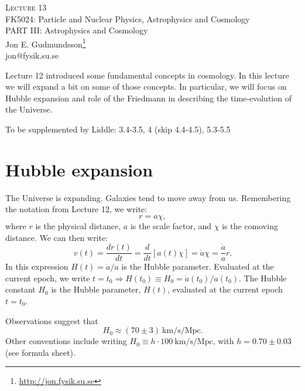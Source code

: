\documentclass[a4paper,12pt]{article}
\theoremstyle{remark}
\newcommand{\mrm}[1]{\mathrm{#1}}
\renewcommand{\=}[1]{\stackrel{#1}{=}} %
\newcommand{\linkc}[1]{\textcolor{linkc}{#1}}
\theoremstyle{plain}
\theoremstyle{definition}
\begin{document}
\fontsize{5mm}{6mm}\selectfont\thispagestyle{empty}

\thispagestyle{empty}
\begin{center}
\textsc{Lecture 13}\\[1.5ex]
{\Huge FK5024: Particle and Nuclear Physics, Astrophysics and Cosmology\\}
\vspace{3mm}
{\large PART III: Astrophysics and Cosmology \\}
Jon E. Gudmundsson\footnote{\href{http://jon.fysik.su.se}{\linkc{http://jon.fysik.su.se}}} \\
\linkc{jon@fysik.su.se}
\end{center}

Lecture 12 introduced some fundamental concepts in cosmology. In this lecture we will expand a bit on some of those concepts. In particular, we will focus on Hubble expansion and role of the Friedmann in describing the time-evolution of the Universe.
\begin{attention}
To be supplemented by Liddle: 3.4-3.5, 4 (skip 4.4-4.5), 5.3-5.5
\end{attention}

\section{Hubble expansion}
The Universe is expanding. Galaxies tend to move away from us. Remembering the notation from Lecture 12, we write:
\begin{equation}
r = a \chi,
\end{equation}
where $r$ is the physical distance, $a$ is the scale factor, and $\chi$ is the comoving distance. We can then write:
\begin{equation}
v(t) = \frac{dr(t)}{dt} = \frac{d}{dt} \left[ a(t) \chi \right] = \dot{a} \chi  = \frac{\dot{a}}{a} r.
\end{equation}
In this expression $H(t) = \dot{a}/a$ is the Hubble parameter. Evaluated at the current epoch, we write $t=t_0 \Rightarrow H(t_0) \equiv H_0 = \dot{a}(t_0) / a(t_0)$. The Hubble constant $H_0$ is the Hubble parameter, $H(t)$, evaluated at the current epoch $t = t_0$. 

Observations suggest that
\begin{equation}
H_0 \approx (70 \pm 3) \:\mrm{km/s/Mpc}.
\end{equation}
Other conventions include writing $H_0 \equiv h \cdot 100 \:\mrm{km/s/Mpc}$, with $h=0.70\pm0.03$ (see formula sheet).
\end{document}
